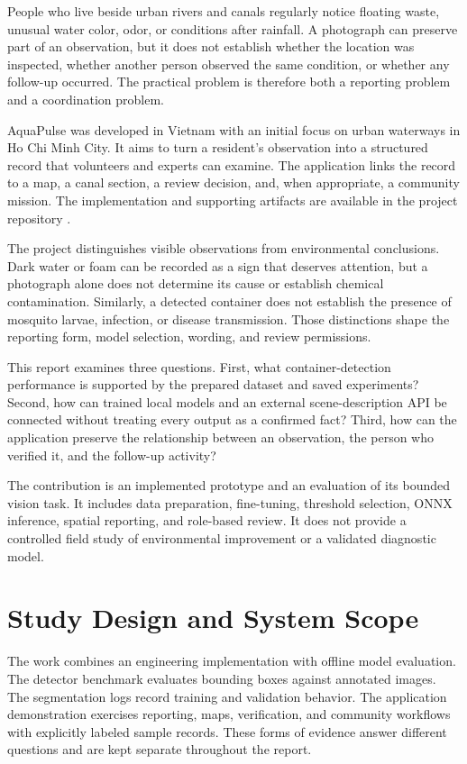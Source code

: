 \documentclass[a4paper,11pt]{article}
\begin{document}
People who live beside urban rivers and canals regularly notice floating waste, unusual water color, odor, or conditions after rainfall. A photograph can preserve part of an observation, but it does not establish whether the location was inspected, whether another person observed the same condition, or whether any follow-up occurred. The practical problem is therefore both a reporting problem and a coordination problem.

AquaPulse was developed in Vietnam with an initial focus on urban waterways in Ho Chi Minh City. It aims to turn a resident's observation into a structured record that volunteers and experts can examine. The application links the record to a map, a canal section, a review decision, and, when appropriate, a community mission. The implementation and supporting artifacts are available in the project repository \cite{ref1}.

The project distinguishes visible observations from environmental conclusions. Dark water or foam can be recorded as a sign that deserves attention, but a photograph alone does not determine its cause or establish chemical contamination. Similarly, a detected container does not establish the presence of mosquito larvae, infection, or disease transmission. Those distinctions shape the reporting form, model selection, wording, and review permissions.

This report examines three questions. First, what container-detection performance is supported by the prepared dataset and saved experiments? Second, how can trained local models and an external scene-description API be connected without treating every output as a confirmed fact? Third, how can the application preserve the relationship between an observation, the person who verified it, and the follow-up activity?

The contribution is an implemented prototype and an evaluation of its bounded vision task. It includes data preparation, fine-tuning, threshold selection, ONNX inference, spatial reporting, and role-based review. It does not provide a controlled field study of environmental improvement or a validated diagnostic model.

\section{Study Design and System Scope}

The work combines an engineering implementation with offline model evaluation. The detector benchmark evaluates bounding boxes against annotated images. The segmentation logs record training and validation behavior. The application demonstration exercises reporting, maps, verification, and community workflows with explicitly labeled sample records. These forms of evidence answer different questions and are kept separate throughout the report.
\end{document}
